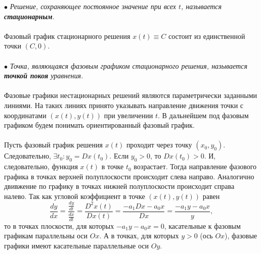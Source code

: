 \documentclass[a4paper, 12pt]{report}
\begin{document}
$\bullet$ \textit{Решение, сохраняющее постоянное значение при всех $t$, называется \textbf{стационарным}.}\\\\
Фазовый график стационарного решения $x(t)\equiv C$ состоит из единственной точки $(C, 0)$.\\\\
$\bullet$ \textit{Точка, являющаяся фазовым графиком стационарного решения, называется \textbf{точкой покоя} уравнения.}\\\\
Фазовые графики нестационарных решений являются параметрически заданными линиями. На таких линиях принято указывать направление движения точки с координатами $(x(t), y(t))$ при увеличении $t$. В дальнейшем под фазовым графиком будем понимать ориентированный фазовый график.\\\\
Пусть фазовый график решения $x(t)$ проходит через точку $(x_0, y_0)$. Следовательно, $\exists t_0 : y_0 = Dx(t_0)$. Если $y_0 > 0$, то $Dx(t_0) > 0$. И, следовательно, функция $x(t)$ в точке $t_0$ возрастает. Тогда направление фазового графика в точках верхней полуплоскости происходит слева направо. Аналогично двивжение по графику в точках нижней полуплоскости происходит справа налево. Так как угловой коэффициент в точке $(x(t), y(t))$ равен $$\dfrac{dy}{dx} = \dfrac{\frac{dy}{dt}}{\frac{dx}{dt}} = \dfrac{D^2x(t)}{Dx(t)} = \dfrac{-a_1Dx - a_0x}{Dx} = \dfrac{-a_1y-a_0x}{y},$$ то в точках плоскости, для которых $-a_1y-a_0x = 0$, касательные к фазовым графикам параллельны оси $Ox$. А в точках, для которых $y > 0$ (ось $Ox$), фазовые графики имеют касательные параллельные оси $Oy$.
\end{document}
